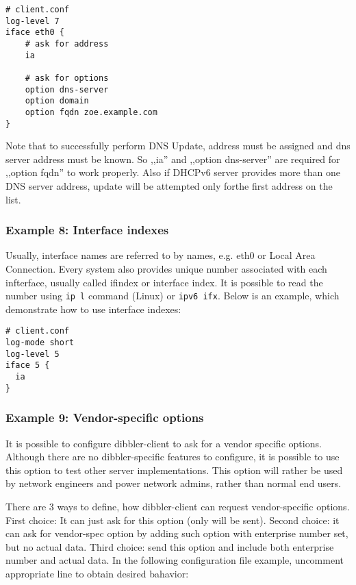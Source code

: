 \begin{lstlisting}
# client.conf
log-level 7
iface eth0 {
    # ask for address
    ia

    # ask for options
    option dns-server
    option domain
    option fqdn zoe.example.com
}
\end{lstlisting}

Note that to successfully perform DNS Update, address must be assigned
and dns server address must be known. So ,,ia'' and ,,option
dns-server'' are required for ,,option fqdn'' to work properly. Also if
DHCPv6 server provides more than one DNS server address, update will
be attempted only forthe first address on the list.


\subsubsection{Example 8: Interface indexes}
Usually, interface names are referred to by names, e.g. eth0 or Local
Area Connection. Every system also provides unique number associated
with each infterface, usually called ifindex or interface index. It is
possible to read the number using \verb+ip l+ command (Linux) or
\verb+ipv6 ifx+. Below is an example, which demonstrate how to use
interface indexes:

\begin{lstlisting}
# client.conf
log-mode short
log-level 5
iface 5 {
  ia
}
\end{lstlisting}

\subsubsection{Example 9: Vendor-specific options}
\label{example-client-vendor-spec}
It is possible to configure dibbler-client to ask for a vendor specific
options. Although there are no dibbler-specific features to configure,
it is possible to use this option to test other server
implementations. This option will rather be used by network engineers
and power network admins, rather than normal end users. 

There are 3 ways to define, how dibbler-client can request
vendor-specific options. First choice: It can just ask for this option (only 
 will be sent). Second choice: it can ask for
vendor-spec option by adding such option with enterprise number set, but
no actual data. Third choice: send this option and include both
enterprise number and actual data. In the following configuration file
example, uncomment appropriate line to obtain desired bahavior:

